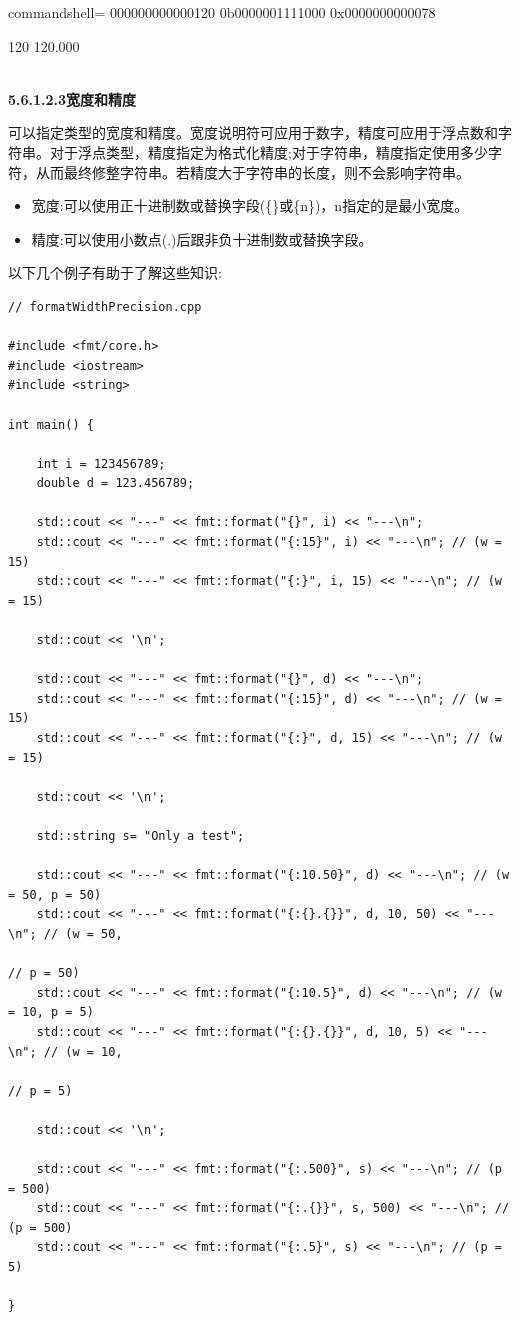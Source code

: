 \begin{tcblisting}{commandshell={}}
000000000000120
0b0000001111000
0x0000000000078

120
120.000
\end{tcblisting}

\hspace*{\fill} \\ %
\noindent
\textbf{5.6.1.2.3\hspace{0.2cm}宽度和精度}

可以指定类型的宽度和精度。宽度说明符可应用于数字，精度可应用于浮点数和字符串。对于浮点类型，精度指定为格式化精度;对于字符串，精度指定使用多少字符，从而最终修整字符串。若精度大于字符串的长度，则不会影响字符串。

\begin{itemize}
\item 
宽度:可以使用正十进制数或替换字段(\{\}或\{n\})，n指定的是最小宽度。

\item 
精度:可以使用小数点(.)后跟非负十进制数或替换字段。
\end{itemize}

以下几个例子有助于了解这些知识:

\begin{lstlisting}[style=styleCXX]
// formatWidthPrecision.cpp

#include <fmt/core.h>
#include <iostream>
#include <string>

int main() {

	int i = 123456789;
	double d = 123.456789;
	
	std::cout << "---" << fmt::format("{}", i) << "---\n";
	std::cout << "---" << fmt::format("{:15}", i) << "---\n"; // (w = 15)
	std::cout << "---" << fmt::format("{:}", i, 15) << "---\n"; // (w = 15)
	
	std::cout << '\n';
	
	std::cout << "---" << fmt::format("{}", d) << "---\n";
	std::cout << "---" << fmt::format("{:15}", d) << "---\n"; // (w = 15)
	std::cout << "---" << fmt::format("{:}", d, 15) << "---\n"; // (w = 15)
	
	std::cout << '\n';
	
	std::string s= "Only a test";
	
	std::cout << "---" << fmt::format("{:10.50}", d) << "---\n"; // (w = 50, p = 50)
	std::cout << "---" << fmt::format("{:{}.{}}", d, 10, 50) << "---\n"; // (w = 50,
	                                                                     // p = 50)
	std::cout << "---" << fmt::format("{:10.5}", d) << "---\n"; // (w = 10, p = 5)
	std::cout << "---" << fmt::format("{:{}.{}}", d, 10, 5) << "---\n"; // (w = 10, 
	                                                                    // p = 5)
	
	std::cout << '\n';
	
	std::cout << "---" << fmt::format("{:.500}", s) << "---\n"; // (p = 500)
	std::cout << "---" << fmt::format("{:.{}}", s, 500) << "---\n"; // (p = 500)
	std::cout << "---" << fmt::format("{:.5}", s) << "---\n"; // (p = 5)

}
\end{lstlisting}


